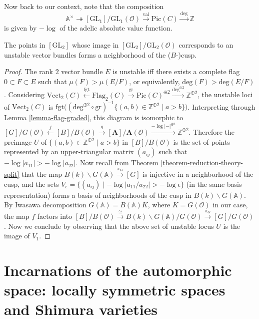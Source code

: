 Now back to our context, note that the composition
\[\mathbb A^\times \twoheadrightarrow [\mathrm{GL}_1]/\mathrm{GL}_1(\mathcal O)\xrightarrow{\mathrm{val}}\mathrm{Pic}(C)\xrightarrow{\mathrm{deg}} \mathbb Z\] is given by $-\log$ of the adelic absolute value function. 

\begin{proposition}\label{proposition-unstable-cusp}
The points in $[\mathrm{GL}_2]$ whose image in $[\mathrm{GL}_2]/\mathrm{GL}_2(\mathcal O)$ corresponds to an unstable vector bundles forms a neighborhood of the ($B$-)cusp. 
\end{proposition}
\begin{proof}
The rank $2$ vector bundle $E$ is unstable iff there exists a complete flag $0\subset F\subset E$ such that $\mu(F)> \mu(E/F)$, or equivalently, $\mathrm{deg}(F)> \mathrm{deg}(E/F)$. Considering $\mathrm{Vect}_2(C)\xleftarrow{\mathrm{fgt}} \mathrm{Flag}_2(C)\xrightarrow{\mathrm{gr}} \mathrm{Pic}(C)^{\oplus 2}\xrightarrow{\mathrm{deg}^{\oplus 2}} \mathbb Z^{\oplus 2}$, the unstable loci of $\mathrm{Vect}_2(C)$ is $\mathrm{fgt}\bigl((\mathrm{deg}^{\oplus 2}\circ\mathrm{gr})^{-1}\{(a, b)\in \mathbb Z^{\oplus 2} \mid a>b \}\bigr)$. Interpreting through Lemma \ref{lemma-flag-graded}, this diagram is isomorphic to $[G]/G(\mathcal O)\xleftarrow{f} [B]/B(\mathcal O) \xrightarrow{g} [\mathbf A]/\mathbf A(\mathcal O) \xrightarrow{-\log \lvert-\rvert^{\oplus 2}} \mathbb Z^{\oplus 2}$. Therefore the preimage $U$ of $\{(a, b)\in \mathbb Z^{\oplus 2} \mid a>b \}$ in $[B]/B(\mathcal O)$ is the set of points represented by an upper-triangular matrix $(a_{ij})$ such that $-\log \lvert a_{11} \rvert> -\log \lvert a_{22}\rvert$. 
Now recall from Theorem \ref{theorem-reduction-theory-split} that the map $B(k)\backslash G(\mathbb A) \xrightarrow{\pi_G} [G]$ is injective in a neighborhood of the cusp, and the sets $V_\epsilon = \{(a_{ij}) \mid -\log\lvert a_{11}/a_{22}\rvert > -\log \epsilon \}$ (in the same basis representation) forms a basis of neighborhoods of the cusp in $B(k)\backslash G(\mathbb A)$. By Iwasawa decomposition $G(\mathbb A) = B(\mathbb A)K$, where $K= G(\mathcal O)$ in our case, the map $f$ factors into $[B]/B(\mathcal O)\xrightarrow{\cong} B(k)\backslash G(\mathbb A)/G(\mathcal O) \xrightarrow{\pi_G} [G]/G(\mathcal O)$. Now we conclude by observing that the above set of unstable locus $U$ is the image of $V_1$. 
\end{proof}


\section{Incarnations of the automorphic space: locally symmetric spaces and Shimura varieties}
\label{section-locally-symmetric-Shimura}

